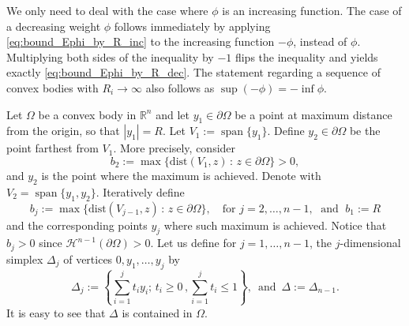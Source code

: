 \documentclass[10pt,leqno]{amsart}
\makeatletter
\newcommand{\R}[0]{\mathbb{R}}
\newcommand{\p}{\partial}
\newcommand{\dist}{\mathrm{dist}}
\numberwithin{Theorem}{section}
\theoremstyle{definition}
\theoremstyle{remark}
\numberwithin{equation}{section}
\numberwithin{equation}{section}
\DeclareMathOperator*{\Span}{span}
\newenvironment{customproof}[1]{%
  \par\pushQED{\qed}%
  \normalfont\topsep6pt \trivlist
  \item[\hskip\labelsep\itshape
    Proof of #1\@addpunct{.}]\ignorespaces
}{%
  \popQED\endtrivlist\@endpefalse
}
\makeatother
\begin{document}
\smallskip


\begin{customproof}{Lemma \ref{lm:bound_on_max_radius_decreasing}}

We only need to deal with the case where $\phi$ is an increasing function. 
The case of a decreasing weight $\phi$ follows immediately by applying \eqref{eq:bound_Ephi_by_R_inc} to the increasing function $ -\phi$, instead of $\phi$. Multiplying both sides of the inequality by $-1$ flips the inequality and yields exactly \eqref{eq:bound_Ephi_by_R_dec}. The statement regarding a sequence of convex bodies with $R_i\to\infty$ also follows as  $\sup (-\phi) = -\inf \phi.$

    Let $\Omega$ be a convex body in $\R^n$ and let $y_1 \in \partial\Omega$ be a point at maximum distance from the origin, so that $|y_1|=R$. Let $V_1:= \Span \{y_1\}$. Define $y_2 \in \p \Omega$ be the point farthest from $V_1$. More precisely, consider
\[
b_2:= \max \{ \dist(V_1,z) \, : \, z \in \p \Omega \}>0,
\]
and $y_2$ is the point where the maximum is achieved. Denote with $V_2=\Span \{y_1,y_2\}$. Iteratively define
\[
b_j:=\max \{ \dist(V_{j-1},z) \, : \, z \in \p \Omega \}, \quad \text{for }j=2,\dots, n-1,\;\text{ and }\; b_1:=R
\]
and the corresponding points $y_j$ where such maximum is achieved.  Notice that $b_j>0$ since  $\mathcal{H}^{n-1}(\p \Omega) >0$.
Let us define for $j=1,\ldots,n-1$, the $j$-dimensional simplex $\Delta_j$ of vertices $0,y_1, \dots, y_j$
by
$$
  \Delta_j:=\left\{ \sum_{i=1}^{j}t_iy_i;\,t_i\geq 0\,, \sum_{i=1}^{j}t_i\leq 1\right\},\,\text{ and }\, \Delta:=\Delta_{n-1}.
$$
It is easy to see %
that $\Delta$ is contained in $\Omega$.


\end{customproof}
\end{document}
